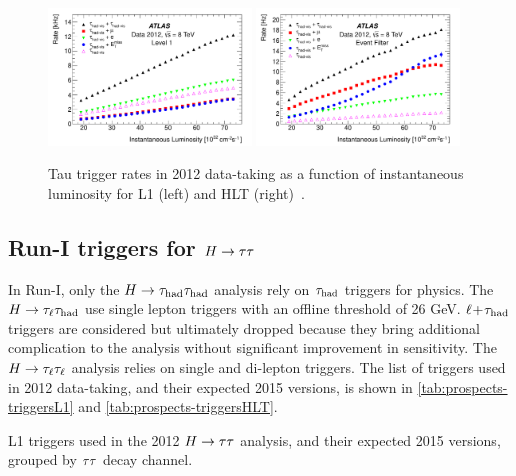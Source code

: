 \begin{figure}[tp]
  \centering
  \includegraphics[width=0.48\textwidth]{figures/PERF-2013-06/fig_01a}
  \includegraphics[width=0.48\textwidth]{figures/PERF-2013-06/fig_01b}
  \caption{Tau trigger rates in 2012 data-taking as a function of instantaneous luminosity for L1 (left) and HLT (right)~\cite{PERF-2013-06}.}
  \label{fig:prospects-tautriggerrates}
\end{figure}

\subsection{Run-I triggers for $H\rightarrow\tau\tau$}

In Run-I, only the $H\rightarrow\tau_\text{had}\tau_\text{had}$ analysis rely on $\tau_\text{had}$ triggers for physics. The $H\rightarrow\tau_\ell\tau_\text{had}$ use single lepton triggers with an offline threshold of 26 GeV. $\ell\!+\!\tau_\text{had}$ triggers are considered but ultimately dropped because they bring additional complication to the analysis without significant improvement in sensitivity. The $H\rightarrow\tau_\ell\tau_\ell$ analysis relies on single and di-lepton triggers. The list of triggers used in 2012 data-taking, and their expected 2015 versions, is shown in \cref{tab:prospects-triggersL1} and \cref{tab:prospects-triggersHLT}.

\begin{table}[bp] 
  \centering
  \renewcommand{\arraystretch}{1.4}
  \caption{L1 triggers used in the 2012 $H\rightarrow\tau\tau$ analysis, and their expected 2015 versions, grouped by $\tau\tau$ decay channel.}
  
  \label{tab:prospects-triggersL1}
\end{table}

